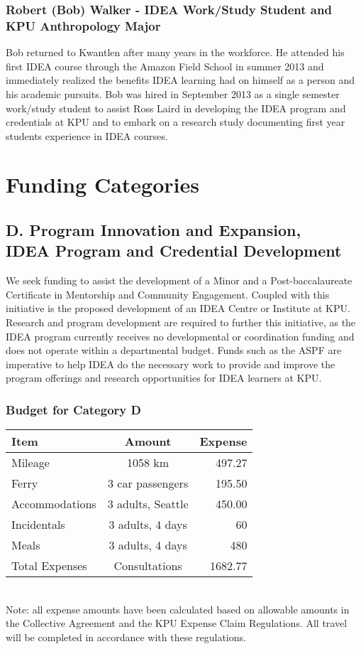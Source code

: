 \documentclass[11pt, letterpaper]{article}
\begin{document}
\subsubsection{Robert (Bob) Walker - IDEA Work/Study Student and KPU
Anthropology Major}

Bob returned to Kwantlen after many years in the workforce. He attended
his first IDEA course through the Amazon Field School in summer 2013 and
immediately realized the benefits IDEA learning had on himself as a
person and his academic pursuits. Bob was hired in September 2013 as a
single semester work/study student to assist Ross Laird in developing
the IDEA program and credentials at KPU and to embark on a research
study documenting first year students experience in IDEA courses.

\section{Funding Categories}

\subsection{D. Program Innovation and Expansion,\\
IDEA Program and Credential Development}

We seek funding to assist the development of a Minor and a Post-baccalaureate Certificate in Mentorship and Community Engagement.
Coupled with this initiative is the proposed development of an IDEA
Centre or Institute at KPU. Research and program development are
required to further this initiative, as the IDEA program currently
receives no developmental or coordination funding and does not operate
within a departmental budget. Funds such as the ASPF are imperative to
help IDEA do the necessary work to provide and improve the program
offerings and research opportunities for IDEA learners at KPU.

\subsubsection{Budget for Category D}


\begin{tabular}{|l|c|r|}
\hline
Item & Amount & Expense \\
\hline
Mileage & 1058 km & 497.27\\
Ferry & 3 car passengers & 195.50\\
Accommodations & 3 adults, Seattle & 450.00\\
Incidentals & 3 adults, 4 days & 60\\
Meals & 3 adults, 4 days & 480\\
\hline
Total Expenses & Consultations & 1682.77\\
\hline
\end{tabular}
\\[1em]
Note: all expense amounts have been calculated based on allowable amounts in the Collective Agreement and the KPU Expense Claim Regulations. All travel will be completed in accordance with these regulations.
\end{document}
